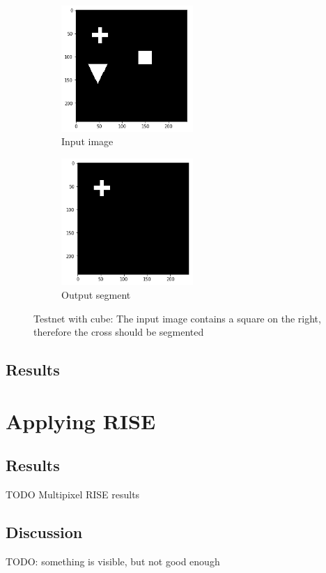 \begin{figure}[H]
    \centering
    \begin{subfigure}{.5\textwidth}
        \centering
        \includegraphics[width=5cm]{chapters/05_testnet/images/testnet_b-0.png}
        \caption{Input image}
    \end{subfigure}%
    \begin{subfigure}{.5\textwidth}
        \centering
        \includegraphics[width=5cm]{chapters/05_testnet/images/testnet_b-1.png}
        \caption{Output segment}
    \end{subfigure}
    \caption{Testnet with cube: The input image contains a square on the right, therefore the cross should be segmented}
\end{figure}


\subsection{Results}

\section{Applying RISE}


\subsection{Results}
TODO Multipixel RISE results

\subsection{Discussion}
TODO: something is visible, but not good enough
